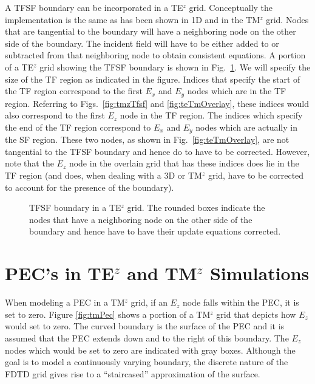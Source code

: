 A TFSF boundary can be incorporated in a TE$^z$ grid.  Conceptually
the implementation is the same as has been shown in 1D and in the
TM$^z$ grid.  Nodes that are tangential to the boundary will have a
neighboring node on the other side of the boundary.  The incident
field will have to be either added to or subtracted from that
neighboring node to obtain consistent equations.  A portion of a
TE$^z$ grid showing the TFSF boundary is shown in Fig.\
\ref{fig:teTfsf}.  We will specify the size of the TF region as
indicated in the figure.  Indices that specify the start of the TF
region correspond to the first $E_x$ and $E_y$ nodes which are in the
TF region.  Referring to Figs.\ \ref{fig:tmzTfsf} and
\ref{fig:teTmOverlay}, these indices would also correspond to the
first $E_z$ node in the TF region.  The indices which specify the end
of the TF region correspond to $E_x$ and $E_y$ nodes which are
actually in the SF region.  These two nodes, as shown in Fig.\
\ref{fig:teTmOverlay}, are not tangential to the TFSF boundary and
hence do to have to be corrected.  However, note that the $E_z$ node
in the overlain grid that has these indices does lie in the TF region
(and does, when dealing with a 3D or TM$^z$ grid, have to be corrected
to account for the presence of the boundary).

\begin{figure}
  \begin{center}
  \end{center} 
  \caption{TFSF boundary in a TE$^z$ grid.  The rounded boxes indicate
  the nodes that have a neighboring node on the other side of the
  boundary and hence have to have their update equations corrected.}
  \label{fig:teTfsf}
\end{figure}

\section{PEC's in TE$^z$ and TM$^z$ Simulations \label{sec:tmzTezPec}}

When modeling a PEC in a TM$^z$ grid, if an $E_z$ node falls within
the PEC, it is set to zero.  Figure \ref{fig:tmPec} shows a portion of
a TM$^z$ grid that depicts how $E_z$ would set to zero.  The curved
boundary is the surface of the PEC and it is assumed that the PEC
extends down and to the right of this boundary.  The $E_z$ nodes which
would be set to zero are indicated with gray boxes.  Although the goal
is to model a continuously varying boundary, the discrete nature of
the FDTD grid gives rise to a ``staircased'' approximation of the
surface.

